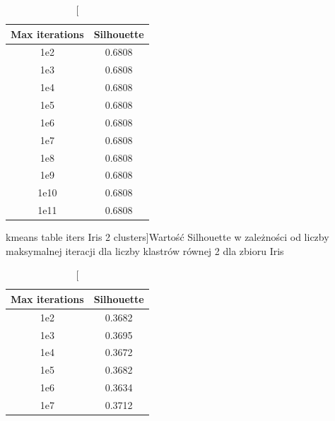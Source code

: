 \documentclass{classrep}
\begin{document}
{{            \begin{table}[!htbp]
                \begin{minipage}{.48\textwidth}
                    \centering
                    \begin{tabular}{|c|c|}
                        \hline
                        Max iterations & Silhouette \\ \hline
                        1e2 & 0.6808 \\ \hline
                        1e3 & 0.6808 \\ \hline
                        1e4 & 0.6808 \\ \hline
                        1e5 & 0.6808 \\ \hline
                        1e6 & 0.6808 \\ \hline
                        1e7 & 0.6808 \\ \hline
                        1e8 & 0.6808 \\ \hline
                        1e9 & 0.6808 \\ \hline
                        1e10 & 0.6808 \\ \hline
                        1e11 & 0.6808 \\ \hline
                    \end{tabular}
                    \caption
                    [kmeans table iters Iris 2 clusters]{Wartość Silhouette w
                    zależności od liczby maksymalnej iteracji dla liczby klastrów
                    równej 2 dla zbioru Iris}
                    \label{kmeans_table_iters_Iris_2_clusters}
                \end{minipage}
                \hfill
                \begin{minipage}{.48\textwidth}
                    \centering
                    \begin{tabular}{|c|c|}
                        \hline
                        Max iterations & Silhouette \\ \hline
                        1e2 & 0.3682 \\ \hline
                        1e3 & 0.3695 \\ \hline
                        1e4 & 0.3672 \\ \hline
                        1e5 & 0.3682 \\ \hline
                        1e6 & 0.3634 \\ \hline
                        1e7 & 0.3712 \\ \hline

\end{tabular}
\end{minipage}
\end{table}}}
\end{document}
